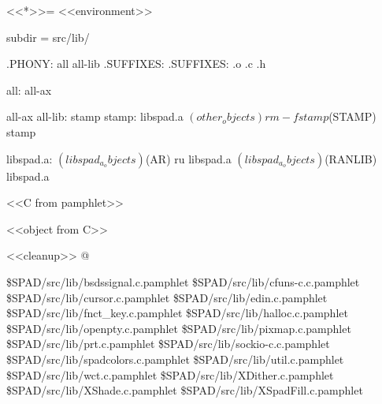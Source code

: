 \documentclass{article}
\begin{document}
<<*>>=
<<environment>>

subdir = src/lib/

.PHONY: all all-lib
.SUFFIXES:
.SUFFIXES: .o .c .h

all: all-ax

all-ax all-lib: stamp
stamp: libspad.a $(other_objects)
	rm -f stamp
	$(STAMP) stamp

libspad.a: $(libspad_a_objects)
	$(AR) ru libspad.a $(libspad_a_objects)
	$(RANLIB) libspad.a

<<C from pamphlet>>

<<object from C>>

<<cleanup>>
@

\eject
\begin{thebibliography}{99}
 {\$SPAD/src/lib/bsdssignal.c.pamphlet}
 {\$SPAD/src/lib/cfuns-c.c.pamphlet}
 {\$SPAD/src/lib/cursor.c.pamphlet}
 {\$SPAD/src/lib/edin.c.pamphlet}
 {\$SPAD/src/lib/fnct\_key.c.pamphlet}
 {\$SPAD/src/lib/halloc.c.pamphlet}
 {\$SPAD/src/lib/openpty.c.pamphlet}
 {\$SPAD/src/lib/pixmap.c.pamphlet}
 {\$SPAD/src/lib/prt.c.pamphlet}
 {\$SPAD/src/lib/sockio-c.c.pamphlet}
 {\$SPAD/src/lib/spadcolors.c.pamphlet}
 {\$SPAD/src/lib/util.c.pamphlet}
 {\$SPAD/src/lib/wct.c.pamphlet}
 {\$SPAD/src/lib/XDither.c.pamphlet}
 {\$SPAD/src/lib/XShade.c.pamphlet}
 {\$SPAD/src/lib/XSpadFill.c.pamphlet}
\end{thebibliography}
\end{document}
